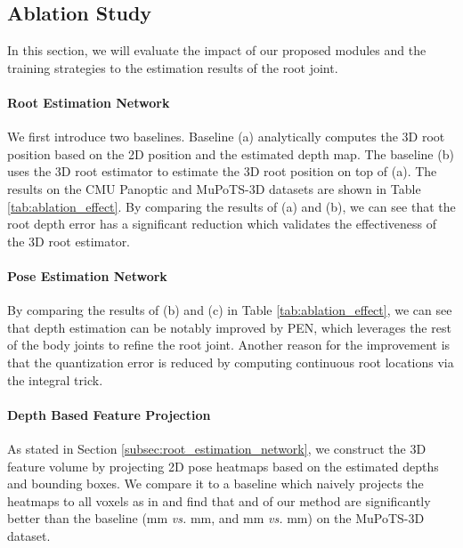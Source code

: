 \subsection{Ablation Study}
\label{subsec:ablation}

In this section, we will evaluate the impact of our proposed modules and the training strategies to the estimation results of the root joint. 


\paragraph{\bf Root Estimation Network} We first introduce two baselines. Baseline (a) analytically computes the 3D root position based on the 2D position and the estimated depth map. The baseline (b) uses the 3D root estimator to estimate the 3D root position on top of (a). The results on the CMU Panoptic and MuPoTS-3D datasets are shown in Table \ref{tab:ablation_effect}. By comparing the results of (a) and (b), we can see that the root depth error has a significant reduction which validates the effectiveness of the 3D root estimator. 


\paragraph{\bf Pose Estimation Network}
By comparing the results of (b) and (c) in Table \ref{tab:ablation_effect}, we can see that depth estimation can be notably improved by PEN, which leverages the rest of the body joints to refine the root joint. Another reason for the improvement is that the quantization error is reduced by computing continuous root locations via the integral trick.


\paragraph{\bf Depth Based Feature Projection} As stated in Section \ref{subsec:root_estimation_network}, we construct the 3D feature volume by projecting 2D pose heatmaps based on the estimated depths and bounding boxes. We compare it to a baseline which naively projects the heatmaps to all voxels as in \cite{iskakov2019learnable, tu2020voxelpose} and find that  and  of our method are significantly better than the baseline (mm \emph{vs.} mm, and mm \emph{vs.} mm) on the MuPoTS-3D dataset.


